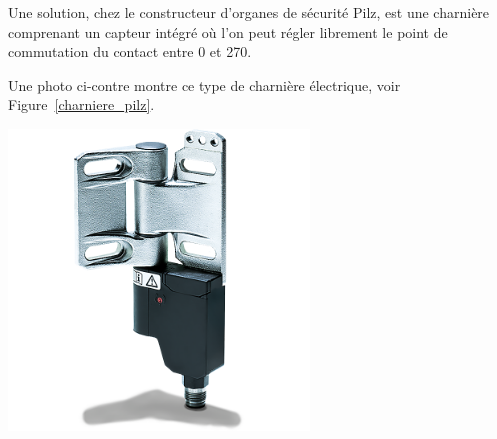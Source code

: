 \begin{minipage}[c]{0.6\textwidth}
    Une solution, chez le constructeur d'organes de sécurité Pilz, est une charnière comprenant un capteur intégré où l'on peut régler librement le point de commutation du contact entre 0\textdegree{} et 270\textdegree{}.

    Une photo ci-contre montre ce type de charnière électrique, voir Figure~\ref{charniere_pilz}.
\end{minipage}\hfill
\begin{minipage}[c]{0.35\textwidth}
    \begin{center}
        \includegraphics[width=0.6\textwidth]{assets/figures/Protections_laser/charniere_pilz.png}
    \end{center}
    \label{charniere_pilz}
\end{minipage}

